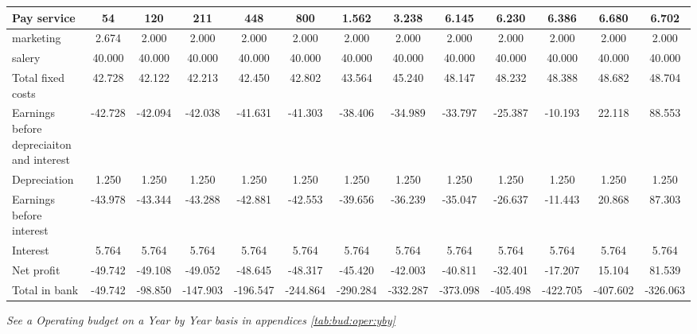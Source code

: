 \begin{tabular}{|p{5cm}|c|c|c|c|c|c|c|c|c|c|c|c|}
\rowcolor[HTML]{C0C0C0} 
Pay service & 54 & 120 & 211 & 448 & 800 & 1.562 & 3.238 & 6.145 & 6.230 & 6.386 & 6.680 & \multicolumn{1}{c|}{\cellcolor[HTML]{C0C0C0}6.702} \\ \hline
marketing & 2.674 & 2.000 & 2.000 & 2.000 & 2.000 & 2.000 & 2.000 & 2.000 & 2.000 & 2.000 & 2.000 & \multicolumn{1}{c|}{2.000} \\ \hline
\rowcolor[HTML]{C0C0C0} 
salery & 40.000 & 40.000 & 40.000 & 40.000 & 40.000 & 40.000 & 40.000 & 40.000 & 40.000 & 40.000 & 40.000 & \multicolumn{1}{c|}{\cellcolor[HTML]{C0C0C0}40.000} \\ \hline \hline
Total fixed costs & 42.728 & 42.122 & 42.213 & 42.450 & 42.802 & 43.564 & 45.240 & 48.147 & 48.232 & 48.388 & 48.682 & \multicolumn{1}{c|}{48.704} \\ \hline \hline
\rowcolor[HTML]{C0C0C0} 
Earnings before depreciaiton and interest & -42.728 & -42.094 & -42.038 & -41.631 & -41.303 & -38.406 & -34.989 & -33.797 & -25.387 & -10.193 & 22.118 & \multicolumn{1}{c|}{\cellcolor[HTML]{C0C0C0}88.553} \\ \hline \hline
Depreciation & 1.250 & 1.250 & 1.250 & 1.250 & 1.250 & 1.250 & 1.250 & 1.250 & 1.250 & 1.250 & 1.250 & \multicolumn{1}{c|}{1.250} \\ \hline
\rowcolor[HTML]{C0C0C0} 
Earnings before interest & -43.978 & -43.344 & -43.288 & -42.881 & -42.553 & -39.656 & -36.239 & -35.047 & -26.637 & -11.443 & 20.868 & \multicolumn{1}{c|}{\cellcolor[HTML]{C0C0C0}87.303} \\ \hline
Interest & 5.764 & 5.764 & 5.764 & 5.764 & 5.764 & 5.764 & 5.764 & 5.764 & 5.764 & 5.764 & 5.764 & \multicolumn{1}{c|}{5.764} \\ \hline \hline
\rowcolor[HTML]{C0C0C0} 
Net profit & -49.742 & -49.108 & -49.052 & -48.645 & -48.317 & -45.420 & -42.003 & -40.811 & -32.401 & -17.207 & 15.104 & \multicolumn{1}{c|}{\cellcolor[HTML]{C0C0C0}81.539} \\ \hline
Total in bank & -49.742 & -98.850 & -147.903 & -196.547 & -244.864 & -290.284 & -332.287 & -373.098 & -405.498 & -422.705 & -407.602 & \multicolumn{1}{c|}{-326.063} \\ \hline
\end{tabular}
\textit{See a Operating budget on a Year by Year basis in appendices \ref{tab:bud:oper:yby}}